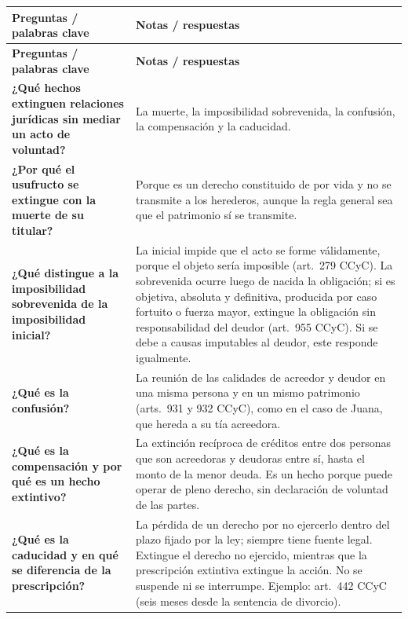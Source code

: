\documentclass[12pt,oneside]{book}
\newlength{\cornellL}
\newlength{\cornellR}
\begin{document}
{\renewcommand{\arraystretch}{1.2}
\begin{longtable}{
    >{\raggedright\arraybackslash}p{\cornellL}
    >{\raggedright\arraybackslash}p{\cornellR}
}
\toprule
\textbf{Preguntas / palabras clave} &
\textbf{Notas / respuestas} \\
\midrule
\endfirsthead

\toprule
\textbf{Preguntas / palabras clave} &
\textbf{Notas / respuestas} \\
\midrule
\endhead

\textbf{¿Qué hechos extinguen relaciones jurídicas sin mediar un acto de voluntad?} &
La muerte, la imposibilidad sobrevenida, la confusión, la compensación y la caducidad. \\
\addlinespace

\textbf{¿Por qué el usufructo se extingue con la muerte de su titular?} &
Porque es un derecho constituido de por vida y no se transmite a los herederos, aunque la regla general sea que el patrimonio sí se transmite. \\
\addlinespace

\textbf{¿Qué distingue a la imposibilidad sobrevenida de la imposibilidad inicial?} &
La inicial impide que el acto se forme válidamente, porque el objeto sería imposible (art.~279 CCyC). La sobrevenida ocurre luego de nacida la obligación; si es objetiva, absoluta y definitiva, producida por caso fortuito o fuerza mayor, extingue la obligación sin responsabilidad del deudor (art.~955 CCyC). Si se debe a causas imputables al deudor, este responde igualmente. \\
\addlinespace

\textbf{¿Qué es la confusión?} &
La reunión de las calidades de acreedor y deudor en una misma persona y en un mismo patrimonio (arts.~931 y 932 CCyC), como en el caso de Juana, que hereda a su tía acreedora. \\
\addlinespace

\textbf{¿Qué es la compensación y por qué es un hecho extintivo?} &
La extinción recíproca de créditos entre dos personas que son acreedoras y deudoras entre sí, hasta el monto de la menor deuda. Es un hecho porque puede operar de pleno derecho, sin declaración de voluntad de las partes. \\
\addlinespace

\textbf{¿Qué es la caducidad y en qué se diferencia de la prescripción?} &
La pérdida de un derecho por no ejercerlo dentro del plazo fijado por la ley; siempre tiene fuente legal. Extingue el derecho no ejercido, mientras que la prescripción extintiva extingue la acción. No se suspende ni se interrumpe. Ejemplo: art.~442 CCyC (seis meses desde la sentencia de divorcio). \\


\end{longtable}}
\end{document}
